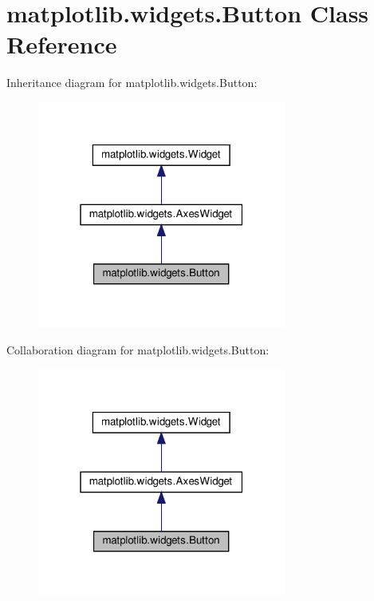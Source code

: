 \hypertarget{classmatplotlib_1_1widgets_1_1Button}{}\section{matplotlib.\+widgets.\+Button Class Reference}
\label{classmatplotlib_1_1widgets_1_1Button}


Inheritance diagram for matplotlib.\+widgets.\+Button\+:
\nopagebreak
\begin{figure}[H]
\begin{center}
\leavevmode
\includegraphics[width=232pt]{classmatplotlib_1_1widgets_1_1Button__inherit__graph}
\end{center}
\end{figure}


Collaboration diagram for matplotlib.\+widgets.\+Button\+:
\nopagebreak
\begin{figure}[H]
\begin{center}
\leavevmode
\includegraphics[width=232pt]{classmatplotlib_1_1widgets_1_1Button__coll__graph}
\end{center}
\end{figure}

